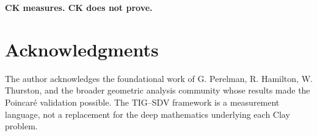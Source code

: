 \documentclass[11pt]{article}
\begin{document}
\medskip
\noindent
\textbf{CK measures.  CK does not prove.}

\section*{Acknowledgments}

The author acknowledges the foundational work of G. Perelman,
R. Hamilton, W. Thurston, and the broader geometric analysis community
whose results made the Poincar\'e validation possible.  The TIG--SDV
framework is a measurement language, not a replacement for the deep
mathematics underlying each Clay problem.

\end{document}
